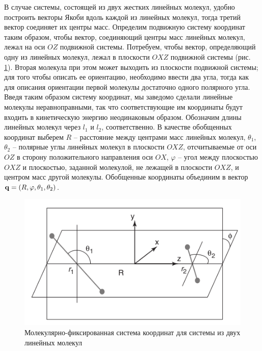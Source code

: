 В случае системы, состоящей из двух жестких линейных молекул, удобно построить векторы Якоби вдоль каждой из линейных молекул, тогда третий вектор соединяет их центры масс. Определим подвижную систему координат таким образом, чтобы вектор, соединяющий центры масс линейных молекул, лежал на оси $OZ$ подвижной системы. Потребуем, чтобы вектор, определяющий одну из линейных молекул, лежал в плоскости $OXZ$ подвижной системы (рис. \ref{fig:two-linear-molecules-body-fixed}). Вторая молекула при этом может выходить из плоскости подвижной системы; для того чтобы описать ее ориентацию, необходимо ввести два угла, тогда как для описания ориентации первой молекулы достаточно одного полярного угла. Введя таким образом систему координат, мы заведомо сделали линейные молекулы неравноправными, так что соответствующие им координаты будут входить в кинетическую энергию неодинаковым образом. Обозначим длины линейных молекул через $l_1$ и $l_2$, соответственно. В качестве обобщенных координат выберем $R$ -- расстояние между центрами масс линейных молекул, $\theta_1$, $\theta_2$ -- полярные углы линейных молекул в плоскости $OXZ$, отсчитываемые от оси $OZ$ в сторону положительного направления оси $OX$, $\varphi$ -- угол между плоскостью $OXZ$ и плоскостью, заданной молекулой, не лежащей в плоскости $OXZ$, и центром масс другой молекулы. Обобщенные координаты объединим в вектор $\mathbf{q} = \left( R, \varphi, \theta_1, \theta_2 \right)$. 

\begin{figure}[H]
    \centering
    \includegraphics[width=0.5\linewidth]{pictures/n2n2_coordinate_frame.png}
    \caption{Молекулярно-фиксированная система координат для системы из двух линейных молекул}
    \label{fig:two-linear-molecules-body-fixed}
\end{figure}

